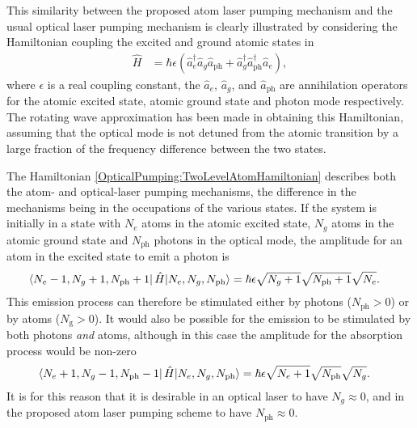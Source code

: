 This similarity between the proposed atom laser pumping mechanism and the usual optical laser pumping mechanism is clearly illustrated by considering the Hamiltonian coupling the excited and ground atomic states in 
\begin{align}
    \hat{H} &= \hbar \epsilon \left(\hat{a}_e^\dagger \hat{a}_g \hat{a}_\text{ph} + \hat{a}_g^\dagger \hat{a}_\text{ph}^\dagger \hat{a}_e  \right),
    \label{OpticalPumping:TwoLevelAtomHamiltonian}
\end{align}
where $\epsilon$ is a real coupling constant, the $\hat{a}_e$, $\hat{a}_g$, and $\hat{a}_\text{ph}$ are annihilation operators for the atomic excited state, atomic ground state and photon mode respectively.  The rotating wave approximation has been made in obtaining this Hamiltonian, assuming that the optical mode is not detuned from the atomic transition by a large fraction of the frequency difference between the two states.  

The Hamiltonian \eqref{OpticalPumping:TwoLevelAtomHamiltonian} describes both the atom- and optical-laser pumping mechanisms, the difference in the mechanisms being in the occupations of the various states.  If the system is initially in a state with $N_e$ atoms in the atomic excited state, $N_g$ atoms in the atomic ground state and $N_\text{ph}$ photons in the optical mode, the amplitude for an atom in the excited state to emit a photon is
\begin{align}
    \left<N_e-1, N_g + 1, N_\text{ph} + 1\right| \hat{H} {\left|N_e, N_g, N_\text{ph}\right>} &= \hbar \epsilon \sqrt{N_g+1} \sqrt{N_\text{ph}+1} \sqrt{N_e}.
\end{align}
This emission process can therefore be stimulated either by photons ($N_\text{ph} > 0$) or by atoms ($N_\text{g} > 0$).  It would also be possible for the emission to be stimulated by both photons \emph{and} atoms, although in this case the amplitude for the absorption process would be non-zero
\begin{align}
    \left<N_e+1, N_g - 1, N_\text{ph} - 1\right| \hat{H} {\left|N_e, N_g, N_\text{ph}\right>} &= \hbar \epsilon \sqrt{N_e+1} \sqrt{N_\text{ph}} \sqrt{N_g}.
\end{align}
It is for this reason that it is desirable in an optical laser to have $N_g \approx 0$, and in the proposed atom laser pumping scheme to have $N_\text{ph} \approx 0$.

